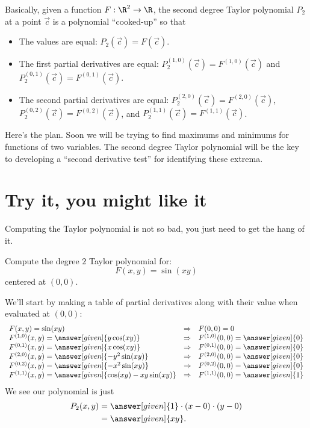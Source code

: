\documentclass{ximera}
\begin{document}
Basically, given a function $F:\R^2\to\R$, the second degree Taylor
polynomial $P_2$ at a point $\vec{c}$ is a polynomial ``cooked-up'' so that
\begin{itemize}
\item The values are equal: $P_2(\vec{c}) = F(\vec{c})$.
\item The first partial derivatives are equal: $P_2^{(1,0)}(\vec{c}) =
  F^{(1,0)}(\vec{c})$ and $P_2^{(0,1)}(\vec{c}) = F^{(0,1)}(\vec{c})$.
\item The second partial derivatives are equal: $P_2^{(2,0)}(\vec{c})
  = F^{(2,0)}(\vec{c})$, $P_2^{(0,2)}(\vec{c}) = F^{(0,2)}(\vec{c})$,
  and $P_2^{(1,1)}(\vec{c}) = F^{(1,1)}(\vec{c})$.
\end{itemize}

Here's the plan. Soon we will be trying to find maximums and minimums
for functions of two variables. The second degree Taylor polynomial
will be the key to developing a ``second derivative test'' for
identifying these extrema. 

\section{Try it, you might like it}

Computing the Taylor polynomial is not so bad, you just need to get
the hang of it.

\begin{example}
  Compute the degree $2$ Taylor polynomial for:
  \[
  F(x,y)=\sin(xy)
  \]
  centered at $(0,0)$.
  \begin{explanation}
    We'll start by making a table of partial derivatives along with
    their value when evaluated at $(0,0)$:
    \[
    \begin{array}{lcl}
      F(x,y) = \sin(xy) & \Rightarrow &F(0,0) = 0\\
      F^{(1,0)}(x,y) = \answer[given]{y\cos(xy)} & \Rightarrow & F^{(1,0)}(0,0) = \answer[given]{0}\\
      F^{(0,1)}(x,y) = \answer[given]{x\cos(xy)} &\Rightarrow  & F^{(0,1)}(0,0) = \answer[given]{0}\\
      F^{(2,0)}(x,y) = \answer[given]{-y^2\sin(xy)} &\Rightarrow & F^{(2,0)}(0,0) = \answer[given]{0}\\
      F^{(0,2)}(x,y) = \answer[given]{-x^2\sin(xy)} &\Rightarrow & F^{(0,2)}(0,0) = \answer[given]{0}\\
      F^{(1,1)}(x,y) = \answer[given]{\cos(xy)-xy\sin(xy)} &\Rightarrow & F^{(1,1)}(0,0) = \answer[given]{1}
    \end{array}
    \]
    We see our polynomial is just
    \begin{align*}
      P_2(x,y) &= \answer[given]{1}\cdot (x-0)\cdot (y-0)\\
      &= \answer[given]{xy}.
    \end{align*}
  \end{explanation}
\end{example}
\end{document}
